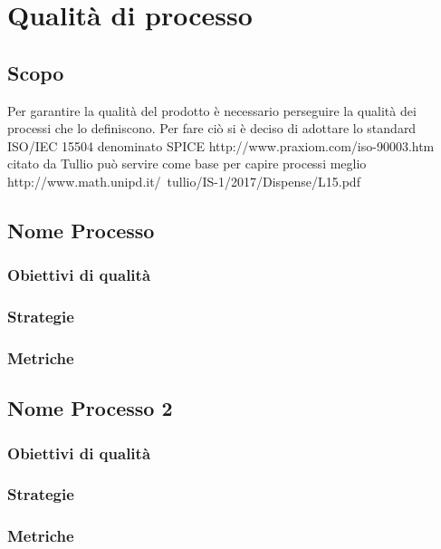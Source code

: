 \documentclass[PianoDiProgetto.tex]{subfiles}
\begin{document}
\chapter{Qualità di processo}

\section{Scopo}
Per garantire la qualità del prodotto è necessario perseguire la qualità dei processi che lo definiscono.
Per fare ciò si è deciso di adottare lo standard ISO/IEC 15504 denominato SPICE 
http://www.praxiom.com/iso-90003.htm citato da Tullio può servire come base per capire processi meglio
http://www.math.unipd.it/~tullio/IS-1/2017/Dispense/L15.pdf

\section{Nome Processo}
	\subsection{Obiettivi di qualità}
	\subsection{Strategie}
	\subsection{Metriche}

\section{Nome Processo 2}
	\subsection{Obiettivi di qualità}
	\subsection{Strategie}
	\subsection{Metriche}
\end{document}
